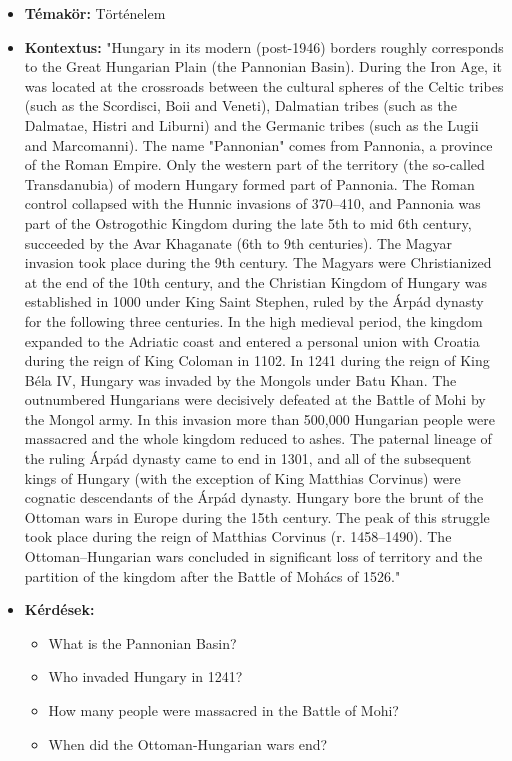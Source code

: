 \begin{itemize}
\hrule	
	
\item \textbf{Témakör:} Történelem
\item \textbf{Kontextus:} "Hungary in its modern (post-1946) borders roughly corresponds to the Great Hungarian Plain (the Pannonian Basin). During the Iron Age, it was located at the crossroads between the cultural spheres of the Celtic tribes (such as the Scordisci, Boii and Veneti), Dalmatian tribes (such as the Dalmatae, Histri and Liburni) and the Germanic tribes (such as the Lugii and Marcomanni). The name "Pannonian" comes from Pannonia, a province of the Roman Empire. Only the western part of the territory (the so-called Transdanubia) of modern Hungary formed part of Pannonia. The Roman control collapsed with the Hunnic invasions of 370–410, and Pannonia was part of the Ostrogothic Kingdom during the late 5th to mid 6th century, succeeded by the Avar Khaganate (6th to 9th centuries). The Magyar invasion took place during the 9th century. The Magyars were Christianized at the end of the 10th century, and the Christian Kingdom of Hungary was established in 1000 under King Saint Stephen, ruled by the Árpád dynasty for the following three centuries. In the high medieval period, the kingdom expanded to the Adriatic coast and entered a personal union with Croatia during the reign of King Coloman in 1102. In 1241 during the reign of King Béla IV, Hungary was invaded by the Mongols under Batu Khan. The outnumbered Hungarians were decisively defeated at the Battle of Mohi by the Mongol army. In this invasion more than 500,000 Hungarian people were massacred and the whole kingdom reduced to ashes. The paternal lineage of the ruling Árpád dynasty came to end in 1301, and all of the subsequent kings of Hungary (with the exception of King Matthias Corvinus) were cognatic descendants of the Árpád dynasty. Hungary bore the brunt of the Ottoman wars in Europe during the 15th century. The peak of this struggle took place during the reign of Matthias Corvinus (r. 1458–1490). The Ottoman–Hungarian wars concluded in significant loss of territory and the partition of the kingdom after the Battle of Mohács of 1526."
\item \textbf{Kérdések:} 
	\begin{itemize}
		\item What is the Pannonian Basin?
		\item Who invaded Hungary in 1241?
		\item How many people were massacred in the Battle of Mohi?
		\item When did the Ottoman-Hungarian wars end?
	\end{itemize}
	

\end{itemize}
